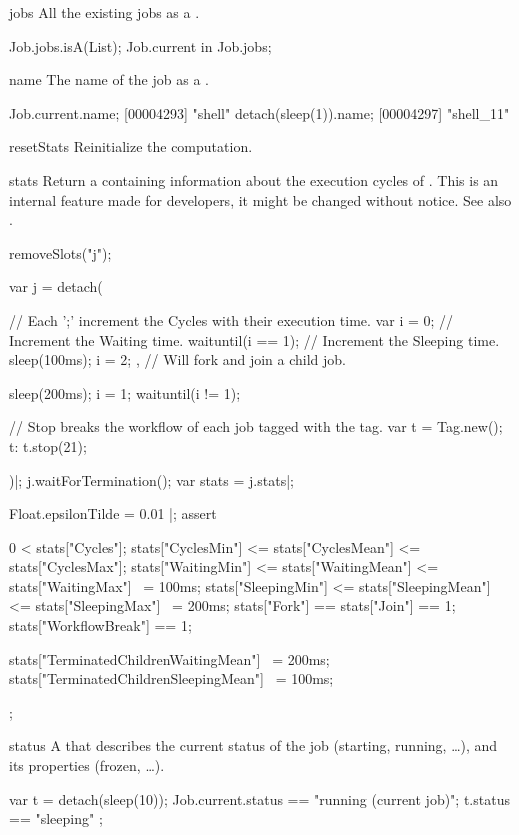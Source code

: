 \begin{urbiscriptapi}
\item[jobs]%
  All the existing jobs as a .
\begin{urbiassert}
Job.jobs.isA(List);
Job.current in Job.jobs;
\end{urbiassert}


\item[name] The name of the job as a .
\begin{urbiscript}
Job.current.name;
[00004293] "shell"
detach(sleep(1)).name;
[00004297] "shell_11"
\end{urbiscript}


\item[resetStats]%
  Reinitialize the  computation.


\item[stats]%
  Return a  containing information about the execution
  cycles of \urbi.  This is an internal feature made for developers, it
  might be changed without notice.  See also .
\begin{urbicomment}
removeSlots("j");
\end{urbicomment}
\begin{urbiscript}
var j = detach({
  // Each ';' increment the Cycles with their execution time.
  var i = 0;
  {
    // Increment the Waiting time.
    waituntil(i == 1);
    // Increment the Sleeping time.
    sleep(100ms);
    i = 2;
  }, // Will fork and join a child job.

  sleep(200ms);
  i = 1;
  waituntil(i != 1);

  // Stop breaks the workflow of each job tagged with the tag.
  var t = Tag.new();
  t: t.stop(21);
})|;
j.waitForTermination();
var stats = j.stats|;

Float.epsilonTilde = 0.01 |;
assert
{
  0 < stats["Cycles"];
  stats["CyclesMin"] <= stats["CyclesMean"] <= stats["CyclesMax"];
  stats["WaitingMin"] <= stats["WaitingMean"] <= stats["WaitingMax"] ~= 100ms;
  stats["SleepingMin"] <= stats["SleepingMean"] <= stats["SleepingMax"] ~= 200ms;
  stats["Fork"] == stats["Join"] == 1;
  stats["WorkflowBreak"] == 1;

  stats["TerminatedChildrenWaitingMean"] ~= 200ms;
  stats["TerminatedChildrenSleepingMean"] ~= 100ms;
};
\end{urbiscript}


\item[status] A  that describes the current status of the
  job (starting, running, \ldots), and its properties (frozen, \ldots).
\begin{urbiassert}
var t = detach(sleep(10));
Job.current.status == "running (current job)";
t.status == "sleeping" ;
\end{urbiassert}



\end{urbiscriptapi}
